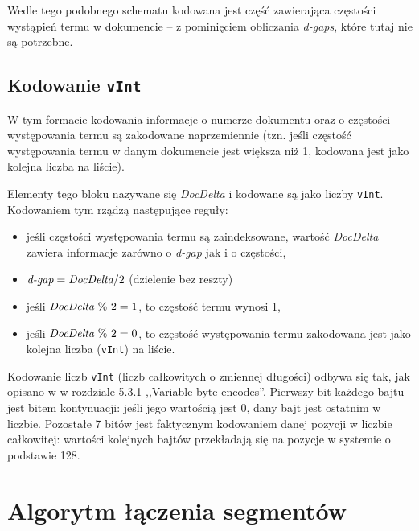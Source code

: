 Wedle tego podobnego schematu kodowana jest część zawierająca częstości wystąpień termu w dokumencie -- z pominięciem obliczania \emph{d-gaps}, które tutaj nie są potrzebne.

\subsection{Kodowanie \texttt{vInt}}

W tym formacie kodowania informacje o numerze dokumentu oraz o częstości występowania termu są zakodowane naprzemiennie (tzn. jeśli częstość występowania termu w danym dokumencie jest większa niż 1, kodowana jest jako kolejna liczba na liście). 

Elementy tego bloku nazywane się \emph{DocDelta} i kodowane są jako liczby \texttt{vInt}. Kodowaniem tym rządzą następujące reguły:
\begin{itemize}
 \item jeśli częstości występowania termu są zaindeksowane, wartość \emph{DocDelta} zawiera informacje zarówno o \emph{d-gap} jak i o częstości,
 \item $\emph{d-gap} = \emph{DocDelta} / 2$ (dzielenie bez reszty)
 \item jeśli $\emph{DocDelta}~\%~2 = 1$, to częstość termu wynosi 1,
 \item jeśli $\emph{DocDelta}~\%~2 = 0$, to częstość występowania termu zakodowana jest jako kolejna liczba (\texttt{vInt}) na liście.
\end{itemize}

Kodowanie liczb \texttt{vInt} (liczb całkowitych o zmiennej długości) odbywa się tak, jak opisano w \cite{irbook} w rozdziale 5.3.1 ,,Variable byte encodes''. Pierwszy bit każdego bajtu jest bitem kontynuacji: jeśli jego wartością jest 0, dany bajt jest ostatnim w liczbie. Pozostałe 7 bitów jest faktycznym kodowaniem danej pozycji w liczbie całkowitej: wartości kolejnych bajtów przekładają się na pozycje w systemie o podstawie 128.

\section{Algorytm łączenia segmentów}

